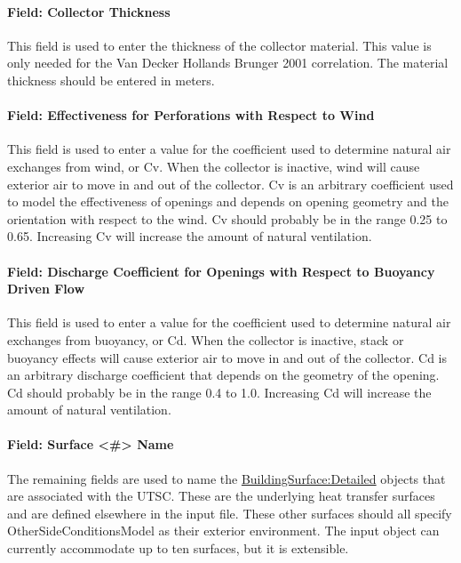 \paragraph{Field: Collector Thickness}\label{field-collector-thickness}

This field is used to enter the thickness of the collector material. This value is only needed for the Van Decker Hollands Brunger 2001 correlation. The material thickness should be entered in meters.

\paragraph{Field: Effectiveness for Perforations with Respect to Wind}\label{field-effectiveness-for-perforations-with-respect-to-wind-000}

This field is used to enter a value for the coefficient used to determine natural air exchanges from wind, or Cv. When the collector is inactive, wind will cause exterior air to move in and out of the collector. Cv is an arbitrary coefficient used to model the effectiveness of openings and depends on opening geometry and the orientation with respect to the wind. Cv should probably be in the range 0.25 to 0.65. Increasing Cv will increase the amount of natural ventilation.

\paragraph{Field: Discharge Coefficient for Openings with Respect to Buoyancy Driven Flow}\label{field-discharge-coefficient-for-openings-with-respect-to-buoyancy-driven-flow-000}

This field is used to enter a value for the coefficient used to determine natural air exchanges from buoyancy, or Cd. When the collector is inactive, stack or buoyancy effects will cause exterior air to move in and out of the collector. Cd is an arbitrary discharge coefficient that depends on the geometry of the opening. Cd should probably be in the range 0.4 to 1.0. Increasing Cd will increase the amount of natural ventilation.

\paragraph{Field: Surface \textless{}\#\textgreater{} Name}\label{field-surface-name-3-001}

The remaining fields are used to name the \hyperref[buildingsurfacedetailed]{BuildingSurface:Detailed} objects that are associated with the UTSC. These are the underlying heat transfer surfaces and are defined elsewhere in the input file. These other surfaces should all specify OtherSideConditionsModel as their exterior environment. The input object can currently accommodate up to ten surfaces, but it is extensible.

